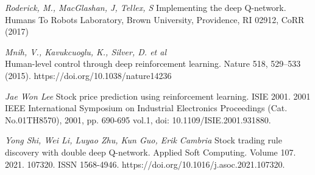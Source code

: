 \documentclass[letterpaper]{article}
\begin{document}
\smallskip \noindent \textit{Roderick, M., MacGlashan, J, Tellex, S} 
Implementing the deep Q-network.  Humans To Robots Laboratory, Brown University, Providence, RI 02912, CoRR (2017)

\smallskip \noindent \textit{Mnih, V., Kavukcuoglu, K., Silver, D. et al}\\
Human-level control through deep reinforcement learning. Nature 518, 529–533 (2015). 
https://doi.org/10.1038/nature14236

\smallskip \noindent \textit{Jae Won Lee} 
Stock price prediction using reinforcement learning. ISIE 2001. 2001 IEEE International Symposium on Industrial Electronics Proceedings (Cat. No.01TH8570), 2001, pp. 690-695 vol.1, 
doi: 10.1109/ISIE.2001.931880.

\smallskip \noindent \textit{Yong Shi, Wei Li, Luyao Zhu, Kun Guo, Erik Cambria}
Stock trading rule discovery with double deep Q-network. Applied Soft Computing. Volume 107. 2021. 107320. ISSN 1568-4946.
https://doi.org/10.1016/j.asoc.2021.107320.
\end{document}
